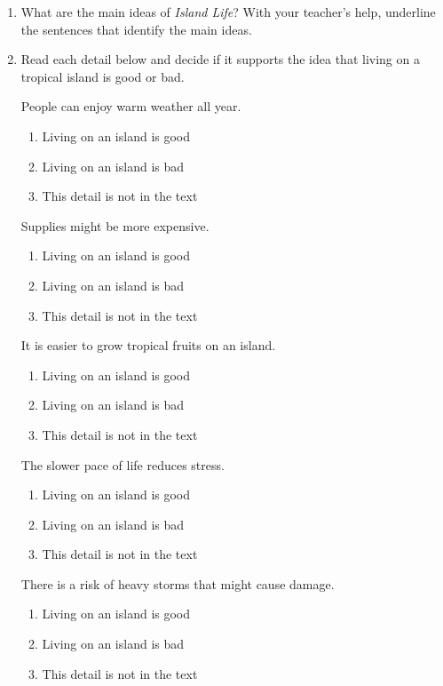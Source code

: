 \documentclass[12pt]{article}
\begin{document}
\begin{tcolorbox}[colframe=black!60, colback=white, 
coltitle=black, colbacktitle=black!15, fonttitle=\bfseries\Large, 
title=Guided Practice, halign title=center, left=10pt, right=10pt, top=10pt, bottom=15pt]


\vspace{1cm}

\begin{enumerate}[itemsep=2em] %
    \item What are the main ideas of \textit{Island Life}? With your teacher's help, underline the sentences that identify the main ideas. 
    \item Read each detail below and decide if it supports the idea that living on a tropical island is good or bad.

People can enjoy warm weather all year. 
\begin{enumerate}
    \item Living on an island is good 
    \item Living on an island is bad 
    \item This detail is not in the text
\end{enumerate}

Supplies might be more expensive.
\begin{enumerate}
    \item Living on an island is good 
    \item Living on an island is bad 
    \item This detail is not in the text
\end{enumerate}

It is easier to grow tropical fruits on an island.
\begin{enumerate}
    \item Living on an island is good 
    \item Living on an island is bad 
    \item This detail is not in the text

\end{enumerate}
The slower pace of life reduces stress.
\begin{enumerate}
    \item Living on an island is good 
    \item Living on an island is bad 
    \item This detail is not in the text
\end{enumerate}

There is a risk of heavy storms that might cause damage. 
\begin{enumerate}
    \item Living on an island is good 
    \item Living on an island is bad 
    \item This detail is not in the text
\end{enumerate}





\end{enumerate}
\vspace{1em}
\end{tcolorbox}
\end{document}
